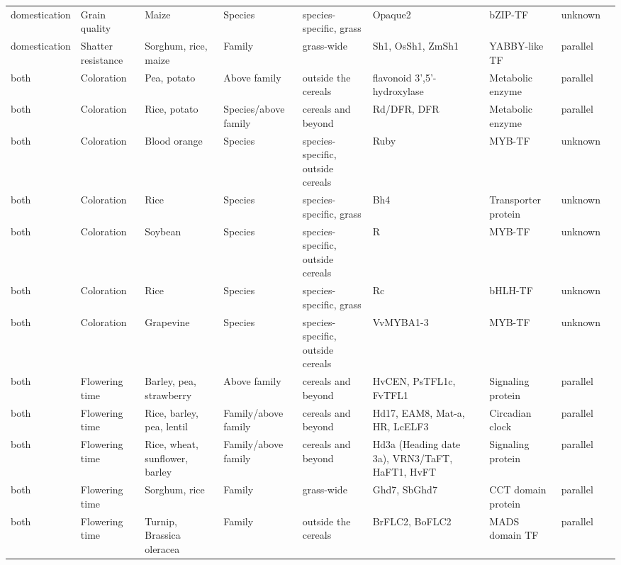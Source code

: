 \documentclass[12pt]{article}
\begin{document}
\begin{table}
\begin{center}
\begin{tabular}{C{1.5cm}G{2.5cm}C{3.10cm}C{3.2cm}C{2.3cm}G{3.5cm}G{2.1cm}C{1.3cm}G{1.5cm}}
 domestication & Grain quality &Maize & Species & species-specific, grass & Opaque2 & bZIP-TF & unknown & \citep{Martin2013}\\
 domestication & Shatter resistance &Sorghum, rice, maize & Family & grass-wide & Sh1, OsSh1, ZmSh1 & YABBY-like TF & parallel & \citep{Lin2012}\\
 both & Coloration &Pea, potato & Above family & outside the cereals & flavonoid 3',5'-hydroxylase & Metabolic enzyme & parallel & \citep{Martin2013}\\
 both & Coloration &Rice, potato & Species/above family & cereals and beyond & Rd/DFR, DFR & Metabolic enzyme & parallel & \citep{Furukawa2006, Zhang2009}\\
 both & Coloration &Blood orange & Species & species-specific, outside cereals & Ruby & MYB-TF & unknown & \citep{Butelli2012}\\
 both & Coloration &Rice & Species & species-specific, grass & Bh4 & Transporter protein & unknown & \citep{Zhu2011}\\
 both & Coloration &Soybean & Species & species-specific, outside cereals & R & MYB-TF & unknown & \citep{Gillman2011}\\
 both & Coloration &Rice & Species & species-specific, grass & Rc & bHLH-TF & unknown & \citep{Martin2013}\\
 both & Coloration &Grapevine & Species & species-specific, outside cereals & VvMYBA1-3 & MYB-TF & unknown & \citep{Martin2013}\\
 both & Flowering time &Barley, pea, strawberry & Above family & cereals and beyond & HvCEN, PsTFL1c, FvTFL1 & Signaling protein & parallel & \citep{Comadran2012, Foucher2003, Koskela2012}\\
 both & Flowering time &Rice, barley, pea, lentil & Family/above family & cereals and beyond & Hd17, EAM8, Mat-a, HR, LcELF3 & Circadian clock& parallel & \citep{Weller2012, Matsubara2012, Zakhrabekova2012, Faure2012}\\
 both & Flowering time &Rice, wheat, sunflower, barley & Family/above family & cereals and beyond & Hd3a (Heading date 3a), VRN3/TaFT, HaFT1, HvFT & Signaling protein & parallel & \citep{Yan2006, Takahashi2009, Blackman2010}\\
 both & Flowering time &Sorghum, rice & Family & grass-wide & Ghd7, SbGhd7 & CCT domain protein& parallel & \citep{Xue2008, Murphy2014}\\
 both & Flowering time &Turnip, Brassica oleracea & Family & outside the cereals & BrFLC2, BoFLC2 & MADS domain TF & parallel & \citep{Wu2012, Yuan2009, Okazaki2006}\\

\end{tabular}
\end{center}
\end{table}
\end{document}
